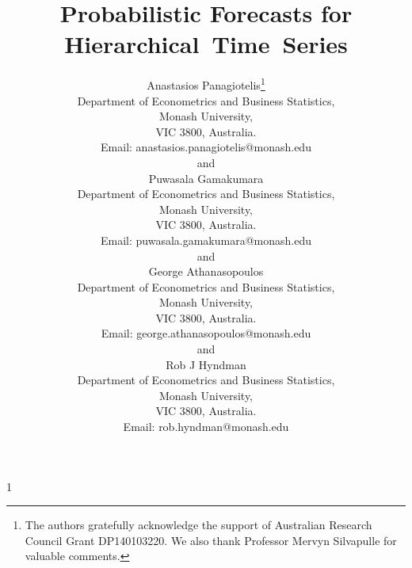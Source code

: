 \documentclass[12pt]{article}
\newcommand{\blind}{1}
\theoremstyle{definition}
\begin{document}
	
	\def\spacingset#1{\renewcommand{\baselinestretch}%
		{#1}\small\normalsize} \spacingset{1}
	
	
	
	\blind
	{
		\title{\bf Probabilistic Forecasts for Hierarchical~Time~Series}
		        \author{
			    Anastasios Panagiotelis\thanks{
			    	The authors gratefully acknowledge the support of Australian Research Council Grant DP140103220.  We also thank Professor Mervyn Silvapulle for valuable comments.}\hspace{.2cm}\\
			    Department of Econometrics and Business Statistics,\\
		    	Monash University,\\ VIC 3800, Australia.\\
			    Email: anastasios.panagiotelis@monash.edu \\
			    and \\
			    Puwasala Gamakumara\\
			    Department of Econometrics and Business Statistics,\\
			    Monash University,\\ VIC 3800, Australia.\\
			    Email: puwasala.gamakumara@monash.edu \\
			    and \\
		        George Athanasopoulos\\
		        Department of Econometrics and Business Statistics,\\
		        Monash University,\\ VIC 3800, Australia.\\
		        Email: george.athanasopoulos@monash.edu \\
		        and \\
	            Rob J Hyndman\\
	            Department of Econometrics and Business Statistics,\\
	            Monash University,\\ VIC 3800, Australia.\\
	            Email: rob.hyndman@monash.edu \\}
		\maketitle
	} \fi
	
\end{document}
